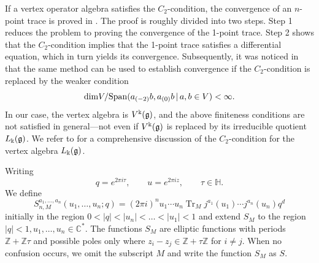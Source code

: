 \documentclass[11pt,a4paper]{amsart}
\numberwithin{equation}{section}
\theoremstyle{definition}
\theoremstyle{remark}
\DeclareMathOperator{\Tr}{Tr}
\newcommand{\CC}{\mathbb C}
\newcommand{\ZZ}{\mathbb Z}
\newcommand{\HH}{\mathbb H}
\newcommand{\kk}{\Bbbk}
\newcommand{\ii}{i}
\newcommand{\e}{e}
\begin{document}
If a vertex operator algebra satisfies the $C_2$-condition, the convergence of an $n$-point trace is proved in \cite{Zhu}.
The proof is roughly divided into two steps. Step 1 reduces the problem to proving the convergence of the 1-point trace. Step 2 shows that the 
$C_2$-condition implies that the 1-point trace satisfies a differential equation, which in turn yields its convergence. Subsequently, it was noticed in \cite{AK} that the same method can be used to establish convergence if the 
$C_2$-condition is replaced by the weaker condition
\[ {\rm dim}  V / \mathrm{Span} ( a_{(-2)} b, a_{(0)} b \, | \, a , b \in V )  < \infty .\]        
In our case, the vertex algebra is $V^{\kk}(\frak{g})$, and the above finiteness conditions are not satisfied in general—not even if $V^{\kk}(\frak{g})$ is replaced by its irreducible quotient $L_{\kk}(\frak{g})$. We refer to \cite{Lin} for a comprehensive discussion of the 
$C_2$-condition for the vertex algebra $L_{\kk}(\frak{g})$.


Writing
\begin{equation*}
q=\e^{2\pi\ii\tau},\qquad
u=\e^{2\pi\ii z},\qquad \tau\in\HH.
\end{equation*}
We define
\begin{equation}\label{n-function}
   S_{n,M}^{a_1 , \dots , a_n }  (  u_1 , \dots , u_n ; q    ) =  ( 2\pi i )^n   u_1 \cdots u_n   \Tr_M  j^{a_1} ( u_1 ) \cdots j^{a_n} ( u_n ) q^d     
\end{equation}   
initially in the region $  0 < |q| < |u_n| < \dots < |u_1| < 1 $ and extend $S_M$ to the region $ |q|<1 ,  u_1 , \dots , u_n \in \CC^* $. 
The functions $ S_M$ are elliptic functions with periods $ \ZZ +\ZZ \tau $ and possible poles only where $z_i-z_j\in\ZZ+\tau\ZZ$ for $i\neq j$. 
When no confusion occurs, we omit the subscript $M$ and write the function
$S_M $ as $S$. 
\end{document}
